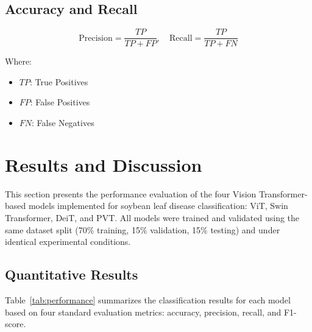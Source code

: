 \documentclass[preprint,12pt]{elsarticle}
\begin{document}
\subsection{Accuracy and Recall}

\begin{equation}
\text{Precision} = \frac{TP}{TP + FP}, \quad \text{Recall} = \frac{TP}{TP + FN}
\label{eq:precision-recall}
\end{equation}

Where:
\begin{itemize}
  \item \( TP \): True Positives
  \item \( FP \): False Positives
  \item \( FN \): False Negatives
\end{itemize}

\section{Results and Discussion}

This section presents the performance evaluation of the four Vision Transformer-based models implemented for soybean leaf disease classification: ViT, Swin Transformer, DeiT, and PVT. All models were trained and validated using the same dataset split (70\% training, 15\% validation, 15\% testing) and under identical experimental conditions.

\subsection{Quantitative Results}

Table~\ref{tab:performance} summarizes the classification results for each model based on four standard evaluation metrics: accuracy, precision, recall, and F1-score.

\begin{table}[H]
\centering
\caption{Performance comparison of Vision Transformer models}
\label{tab:performance}
\end{table}
\end{document}
